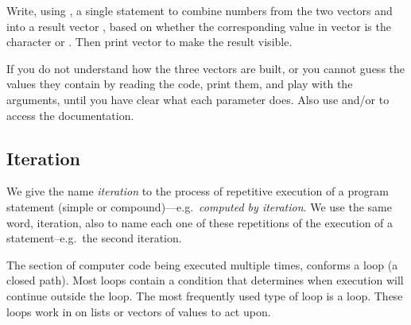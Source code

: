 \documentclass[krantz2]{krantz}\usepackage{knitr}%
\begin{document}
\begin{playground}
Write, using , a single statement to combine numbers from the two vectors  and  into a result vector , based on whether the corresponding value in vector  is the character  or . Then print vector  to make the result visible.

\begin{knitrout}\footnotesize
{}\color{fgcolor}\begin{kframe}
\begin{alltt}
 \hlkwb{<-} \hlopt{-}\hlopt{:-}
 \hlkwb{<-} \hlopt{+}\hlopt{:}
 \hlkwb{<-} \hlstd{(}\hlstd{(}\hlstd{,} \hlstd{),} \hlstd{(}\hlstd{,} \hlstd{))}
\end{alltt}
\end{kframe}
\end{knitrout}

If you do not understand how the three vectors are built, or you cannot guess the values they contain by reading the code, print them, and play with the arguments, until you have clear what each parameter does. Also use  and/or  to access the documentation.
\end{playground}

\subsection{Iteration}
We give the name \emph{iteration} to the process of repetitive execution of a program statement (simple or compound)---e.g.\ \emph{computed by iteration}. We use the same word, iteration, also to name each one of these repetitions of the execution of a statement--e.g.\ the second iteration.

The section of computer code being executed multiple times, conforms a loop (a closed path). Most loops contain a condition that determines when execution will continue outside the loop. The most frequently used type of loop is a  loop. These loops work in \Rlang on lists or vectors of values to act upon.
\end{document}
